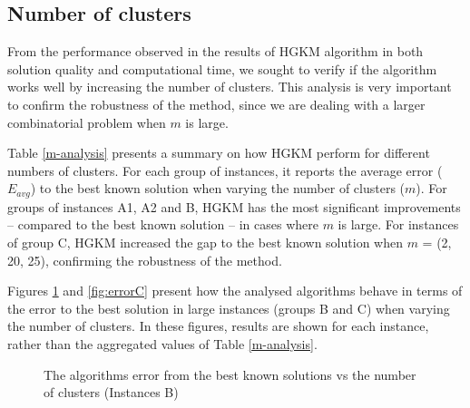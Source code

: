 

\subsection{Number of clusters}

From the performance observed in the results of HGKM algorithm in both solution quality and computational time, we sought to verify if the algorithm works well by increasing the number of clusters. %
This analysis is very important to confirm the robustness of the method, since we are dealing with a larger combinatorial problem when $m$ is large.

Table \ref{m-analysis} presents a summary on how HGKM perform for different numbers of clusters.
For each group of instances, it reports the average error ($E_{avg}$) to the best known solution when varying the number of clusters ($m$). For groups of instances A1, A2 and B, HGKM has the most significant improvements -- compared to the best known solution -- in cases where $m$ is large. For instances of group C, HGKM increased the gap to the best known solution when $m$ = (2, 20, 25), confirming the robustness of the method.



Figures \ref{fig:errorB} and \ref{fig:errorC} present how the analysed algorithms behave in terms of the error to the best solution in large instances (groups B and C) when varying the number of clusters. In these figures, results are shown for each instance, rather than the aggregated values of Table \ref{m-analysis}.

\begin{figure}[H]
\centering
{}
\caption{The algorithms error from the best known solutions vs the number of clusters (Instances B)}
\label{fig:errorB}
\end{figure}

